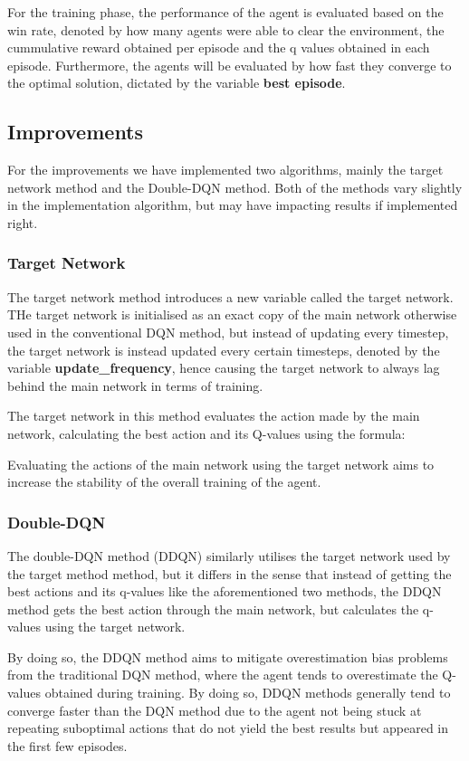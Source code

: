 For the training phase, the performance of the agent is evaluated based on the win rate, denoted by how many agents were able to clear the environment,  the cummulative reward obtained per episode and the q values obtained in each episode. Furthermore, the agents will be evaluated by how fast they converge to the optimal solution, dictated by the variable \textbf{best episode}.

\subsection{Improvements}

For the improvements we have implemented two algorithms, mainly the target network method and the Double-DQN method. Both of the methods vary slightly in the implementation algorithm, but may have impacting results if implemented right. 

\subsubsection{Target Network}
The target network method introduces a new variable called the target network. THe target network is initialised as an exact copy of the main network otherwise used in the conventional DQN method, but instead of updating every timestep, the target network is instead updated every certain timesteps, denoted by the variable \textbf{update\_frequency}, hence causing the target network to always lag behind the main network in terms of training.

The target network in this method evaluates the action made by the main network, calculating the best action and its Q-values using the formula:

Evaluating the actions of the main network using the target network aims to increase the stability of the overall training of the agent.

\subsubsection{Double-DQN}

The double-DQN method (DDQN) similarly utilises the target network used by the target method method, but it differs in the sense that instead of getting the best actions and its q-values like the aforementioned two methods, the DDQN method gets the best action through the main network, but calculates the q-values using the target network.

By doing so, the DDQN method aims to mitigate overestimation bias problems from the traditional DQN method, where the agent tends to overestimate the Q-values obtained during training. By doing so, DDQN methods generally tend to converge faster than the DQN method due to the agent not being stuck at repeating suboptimal actions that do not yield the best results but appeared in the first few episodes.

